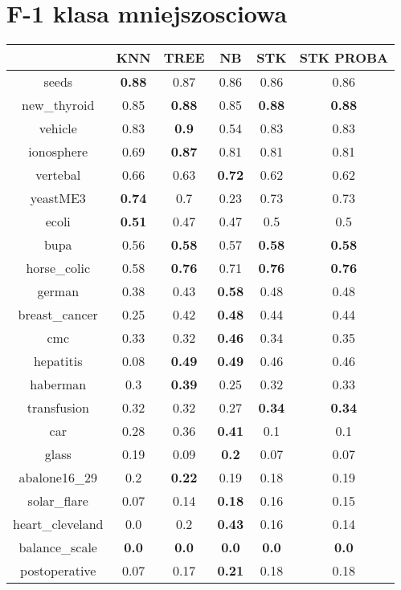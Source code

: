 \documentclass{article}%
\begin{document}
\section*{F{-}1 klasa mniejszosciowa}%
\begin{tabular}{c|ccccc}%
&KNN&TREE&NB&STK&STK PROBA\\%
\hline%
seeds&\textbf{0.88}&0.87&0.86&0.86&0.86\\%
new\_thyroid&0.85&\textbf{0.88}&0.85&\textbf{0.88}&\textbf{0.88}\\%
vehicle&0.83&\textbf{0.9}&0.54&0.83&0.83\\%
ionosphere&0.69&\textbf{0.87}&0.81&0.81&0.81\\%
vertebal&0.66&0.63&\textbf{0.72}&0.62&0.62\\%
yeastME3&\textbf{0.74}&0.7&0.23&0.73&0.73\\%
ecoli&\textbf{0.51}&0.47&0.47&0.5&0.5\\%
bupa&0.56&\textbf{0.58}&0.57&\textbf{0.58}&\textbf{0.58}\\%
horse\_colic&0.58&\textbf{0.76}&0.71&\textbf{0.76}&\textbf{0.76}\\%
german&0.38&0.43&\textbf{0.58}&0.48&0.48\\%
breast\_cancer&0.25&0.42&\textbf{0.48}&0.44&0.44\\%
cmc&0.33&0.32&\textbf{0.46}&0.34&0.35\\%
hepatitis&0.08&\textbf{0.49}&\textbf{0.49}&0.46&0.46\\%
haberman&0.3&\textbf{0.39}&0.25&0.32&0.33\\%
transfusion&0.32&0.32&0.27&\textbf{0.34}&\textbf{0.34}\\%
car&0.28&0.36&\textbf{0.41}&0.1&0.1\\%
glass&0.19&0.09&\textbf{0.2}&0.07&0.07\\%
abalone16\_29&0.2&\textbf{0.22}&0.19&0.18&0.19\\%
solar\_flare&0.07&0.14&\textbf{0.18}&0.16&0.15\\%
heart\_cleveland&0.0&0.2&\textbf{0.43}&0.16&0.14\\%
balance\_scale&\textbf{0.0}&\textbf{0.0}&\textbf{0.0}&\textbf{0.0}&\textbf{0.0}\\%
postoperative&0.07&0.17&\textbf{0.21}&0.18&0.18\\%
\end{tabular}

%
\end{document}
